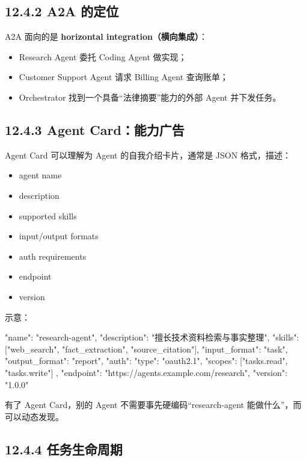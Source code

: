 \subsection{12.4.2 A2A 的定位}

A2A 面向的是 \textbf{horizontal integration（横向集成）}：


\begin{itemize}[leftmargin=2em]
\item Research Agent 委托 Coding Agent 做实现；
\item Customer Support Agent 请求 Billing Agent 查询账单；
\item Orchestrator 找到一个具备``法律摘要''能力的外部 Agent 并下发任务。
\end{itemize}

\subsection{12.4.3 Agent Card：能力广告}

Agent Card 可以理解为 Agent 的自我介绍卡片，通常是 JSON 格式，描述：


\begin{itemize}[leftmargin=2em]
\item agent name
\item description
\item supported skills
\item input/output formats
\item auth requirements
\item endpoint
\item version
\end{itemize}

示意：


\begin{codeblock}
{
  "name": "research-agent",
  "description": "擅长技术资料检索与事实整理",
  "skills": ["web_search", "fact_extraction", "source_citation"],
  "input_format": "task",
  "output_format": "report",
  "auth": {
    "type": "oauth2.1",
    "scopes": ["tasks.read", "tasks.write"]
  },
  "endpoint": "https://agents.example.com/research",
  "version": "1.0.0"
}
\end{codeblock}

有了 Agent Card，别的 Agent 不需要事先硬编码``research-agent 能做什么''，而可以动态发现。


\subsection{12.4.4 任务生命周期}

